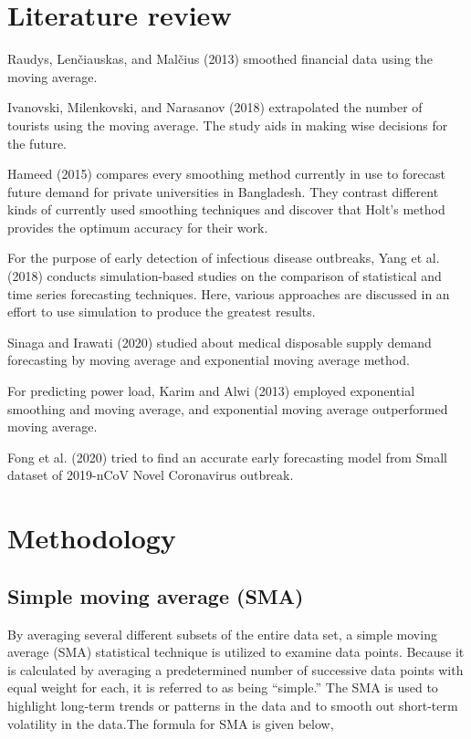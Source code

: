 \documentclass{article}
\begin{document}
\hypertarget{literature-review}{%
\section{Literature review}\label{literature-review}}

Raudys, Lenčiauskas, and Malčius (2013) smoothed financial data using
the moving average.

Ivanovski, Milenkovski, and Narasanov (2018) extrapolated the number of
tourists using the moving average. The study aids in making wise
decisions for the future.

Hameed (2015) compares every smoothing method currently in use to
forecast future demand for private universities in Bangladesh. They
contrast different kinds of currently used smoothing techniques and
discover that Holt's method provides the optimum accuracy for their
work.

For the purpose of early detection of infectious disease outbreaks, Yang
et al. (2018) conducts simulation-based studies on the comparison of
statistical and time series forecasting techniques. Here, various
approaches are discussed in an effort to use simulation to produce the
greatest results.

Sinaga and Irawati (2020) studied about medical disposable supply demand
forecasting by moving average and exponential moving average method.

For predicting power load, Karim and Alwi (2013) employed exponential
smoothing and moving average, and exponential moving average
outperformed moving average.

Fong et al. (2020) tried to find an accurate early forecasting model
from Small dataset of 2019-nCoV Novel Coronavirus outbreak.

\hypertarget{methodology}{%
\section{Methodology}\label{methodology}}

\hypertarget{simple-moving-average-sma}{%
\subsection{Simple moving average
(SMA)}\label{simple-moving-average-sma}}

By averaging several different subsets of the entire data set, a simple
moving average (SMA) statistical technique is utilized to examine data
points. Because it is calculated by averaging a predetermined number of
successive data points with equal weight for each, it is referred to as
being ``simple.'' The SMA is used to highlight long-term trends or
patterns in the data and to smooth out short-term volatility in the
data.The formula for SMA is given below,
\end{document}
